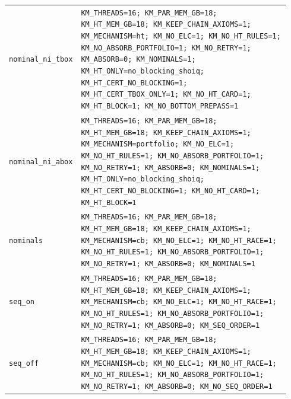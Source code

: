 \begin{longtable}{@{}p{0.18\linewidth}p{0.76\linewidth}@{}}
\texttt{nominal\_ni\_tbox} & \texttt{KM\_THREADS=16; KM\_PAR\_MEM\_GB=18; KM\_HT\_MEM\_GB=18; KM\_KEEP\_CHAIN\_AXIOMS=1; KM\_MECHANISM=ht; KM\_NO\_ELC=1; KM\_NO\_HT\_RULES=1; KM\_NO\_ABSORB\_PORTFOLIO=1; KM\_NO\_RETRY=1; KM\_ABSORB=0; KM\_NOMINALS=1; KM\_HT\_ONLY=no\_blocking\_shoiq; KM\_HT\_CERT\_NO\_BLOCKING=1; KM\_HT\_CERT\_TBOX\_ONLY=1; KM\_NO\_HT\_CARD=1; KM\_HT\_BLOCK=1; KM\_NO\_BOTTOM\_PREPASS=1} \\
\texttt{nominal\_ni\_abox} & \texttt{KM\_THREADS=16; KM\_PAR\_MEM\_GB=18; KM\_HT\_MEM\_GB=18; KM\_KEEP\_CHAIN\_AXIOMS=1; KM\_MECHANISM=portfolio; KM\_NO\_ELC=1; KM\_NO\_HT\_RULES=1; KM\_NO\_ABSORB\_PORTFOLIO=1; KM\_NO\_RETRY=1; KM\_ABSORB=0; KM\_NOMINALS=1; KM\_HT\_ONLY=no\_blocking\_shoiq; KM\_HT\_CERT\_NO\_BLOCKING=1; KM\_NO\_HT\_CARD=1; KM\_HT\_BLOCK=1} \\
\texttt{nominals} & \texttt{KM\_THREADS=16; KM\_PAR\_MEM\_GB=18; KM\_HT\_MEM\_GB=18; KM\_KEEP\_CHAIN\_AXIOMS=1; KM\_MECHANISM=cb; KM\_NO\_ELC=1; KM\_NO\_HT\_RACE=1; KM\_NO\_HT\_RULES=1; KM\_NO\_ABSORB\_PORTFOLIO=1; KM\_NO\_RETRY=1; KM\_ABSORB=0; KM\_NOMINALS=1} \\
\texttt{seq\_on} & \texttt{KM\_THREADS=16; KM\_PAR\_MEM\_GB=18; KM\_HT\_MEM\_GB=18; KM\_KEEP\_CHAIN\_AXIOMS=1; KM\_MECHANISM=cb; KM\_NO\_ELC=1; KM\_NO\_HT\_RACE=1; KM\_NO\_HT\_RULES=1; KM\_NO\_ABSORB\_PORTFOLIO=1; KM\_NO\_RETRY=1; KM\_ABSORB=0; KM\_SEQ\_ORDER=1} \\
\texttt{seq\_off} & \texttt{KM\_THREADS=16; KM\_PAR\_MEM\_GB=18; KM\_HT\_MEM\_GB=18; KM\_KEEP\_CHAIN\_AXIOMS=1; KM\_MECHANISM=cb; KM\_NO\_ELC=1; KM\_NO\_HT\_RACE=1; KM\_NO\_HT\_RULES=1; KM\_NO\_ABSORB\_PORTFOLIO=1; KM\_NO\_RETRY=1; KM\_ABSORB=0; KM\_NO\_SEQ\_ORDER=1} \\
\bottomrule
\end{longtable}
